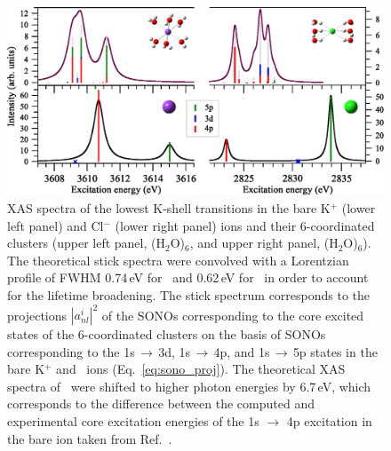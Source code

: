 \begin{figure}[h]
\centering
\includegraphics[scale=0.6]{figures/xas_spectra.eps}
\caption{
XAS spectra of the lowest K-shell transitions in the bare K$^{+}$ (lower left panel) and Cl$^{-}$ (lower right panel) ions and their 6-coordinated clusters (upper left panel, \ki(H$_2$O)$_6$, and upper right panel, \cli(H$_2$O)$_6$). The theoretical stick spectra were convolved with a Lorentzian profile of FWHM 0.74\,eV for \ki~and 0.62\,eV for \cli~in order to account for the lifetime broadening. The stick spectrum corresponds to the projections $|a_{nl}^{i}|^2$ of the SONOs corresponding to the core excited states of the 6-coordinated clusters on the basis of SONOs corresponding to the 1s$\,\rightarrow\,$3d, 1s$\,\rightarrow\,$4p, and 1s$\,\rightarrow\,$5p states in the bare K$^+$ and \cli~ions (Eq.\ \ref{eq:sono_proj}). The theoretical XAS spectra of \ki~were shifted to higher photon energies by 6.7\,eV, which corresponds to the difference between the computed and experimental core excitation energies of the 1s $\rightarrow$ 4p excitation in the bare ion taken from Ref.\ \citep{hertlein06:062715}. }
\label{fg:xas_kcl}
\end{figure}


